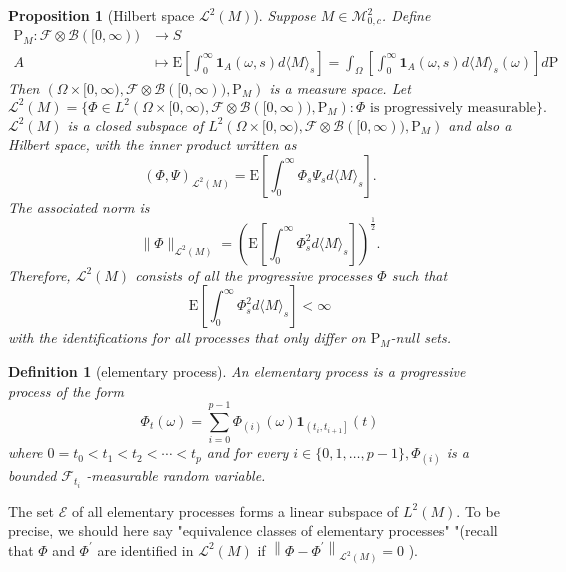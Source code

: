 \documentclass{article}
\newtheorem{definition}{Definition}[section]
\newtheorem{proposition}{Proposition}[section]
\theoremstyle{nonumberplain}
\begin{document}
\begin{proposition}[Hilbert space $\mathscr{L}^2(M)$]
	Suppose $M\in \mathscr{M}^2_{0,c}$. Define
	\begin{align*}
	\mathrm{P}_{M}: \mathcal{F} \otimes \mathcal{B}([0, \infty))&\longrightarrow S\\
	A&\longmapsto \mathrm{E}\left[\int_{0}^{\infty} \mathbf{1}_{A}(\omega, s) d\langle M\rangle_{s}\right]=\int_{\Omega}\left[\int_{0}^{\infty} \mathbf{1}_{A}(\omega, s) d\langle M\rangle_{s}(\omega)\right]d\mathrm{P}
	\end{align*}
	Then $\left( \Omega\times[0, \infty) ,  \mathcal{F}\otimes \mathcal{B}([0, \infty)), \mathrm{P}_{M}\right)$ is a measure space. Let 
	$$
	\mathscr{L}^2(M)=\{\Phi\in L^2\left( \Omega\times[0, \infty) ,\mathcal{F}\otimes \mathcal{B}([0, \infty)), \mathrm{P}_{M}\right):\Phi \text{ is progressively measurable}\}.
	$$
	$\mathscr{L}^2(M)$ is a closed subspace of $L^2\left( \Omega\times[0, \infty) ,\mathcal{F}\otimes \mathcal{B}([0, \infty)), \mathrm{P}_{M}\right)$ and also a Hilbert space, with the inner product written as
	\[
	(\Phi,\Psi)_{\mathscr{L}^2(M)}= \mathrm{E}\left[\int_{0}^{\infty} \Phi_s\Psi_s d\langle M\rangle_{s}\right].
	\]
	The associated norm is
	\[
	\|\Phi\|_{\mathscr{L}^2(M)}=\left(\mathrm{E}\left[\int_{0}^{\infty} \Phi_{s}^{2} d\langle M\rangle_{s}\right]\right)^{\tfrac{1}{2}}.
	\]
	Therefore, $\mathscr{L}^2(M)$ consists of all the progressive processes $\Phi$ such that
	\[
	\mathrm{E}\left[\int_{0}^{\infty} \Phi_{s}^{2} d\langle M\rangle_{s}\right]<\infty
	\]
	with the identifications for all processes that only differ on $\mathrm{P}_M$-null sets.
\end{proposition}

\begin{definition}[elementary process]
An elementary process is a progressive process of the form
\[
\Phi_{t}(\omega)=\sum_{i=0}^{p-1} \Phi_{(i)}(\omega) \mathbf{1}_{\left(t_{i}, t_{i+1}\right]}(t)
\]
where $0=t_{0}<t_{1}<t_{2}<\cdots<t_{p}$ and for every $i \in\{0,1, \ldots, p-1\}, \Phi_{(i)}$ is a
bounded $\mathscr{F}_{t_{i}}$ -measurable random variable.
\end{definition}

The set $\mathscr{E}$ of all elementary processes forms a linear subspace of $L^{2}(M) .$ To be precise, we should here say "equivalence classes of elementary processes" "(recall that $\Phi$ and $\Phi^{\prime}$ are identified in $\mathscr{L}^{2}(M)$ if $\left\|\Phi-\Phi^{\prime}\right\|_{\mathscr{L}^{2}(M)}=0$ ).
\end{document}
